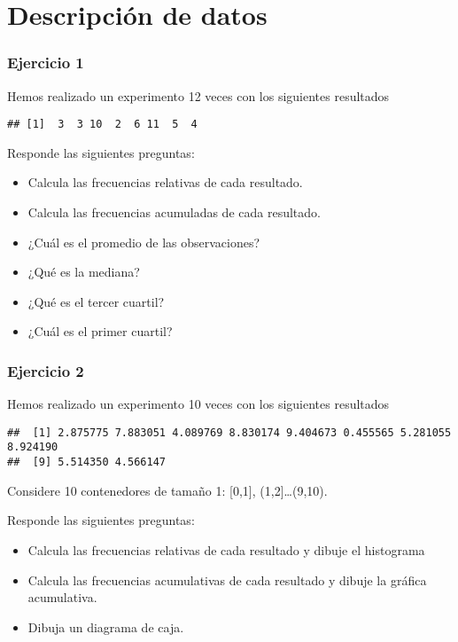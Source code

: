 \documentclass[
]{book}
\providecommand{\tightlist}{%
  \setlength{\itemsep}{0pt}\setlength{\parskip}{0pt}}
\begin{document}
\hypertarget{descripciuxf3n-de-datos-1}{%
\section{Descripción de datos}\label{descripciuxf3n-de-datos-1}}

\hypertarget{ejercicio-1}{%
\subsubsection{Ejercicio 1}\label{ejercicio-1}}

Hemos realizado un experimento 12 veces con los siguientes resultados

\begin{verbatim}
## [1]  3  3 10  2  6 11  5  4
\end{verbatim}

Responde las siguientes preguntas:

\begin{itemize}
\tightlist
\item
  Calcula las frecuencias relativas de cada resultado.
\item
  Calcula las frecuencias acumuladas de cada resultado.
\item
  ¿Cuál es el promedio de las observaciones?
\item
  ¿Qué es la mediana?
\item
  ¿Qué es el tercer cuartil?
\item
  ¿Cuál es el primer cuartil?
\end{itemize}

\hypertarget{ejercicio-2}{%
\subsubsection{Ejercicio 2}\label{ejercicio-2}}

Hemos realizado un experimento 10 veces con los siguientes resultados

\begin{verbatim}
##  [1] 2.875775 7.883051 4.089769 8.830174 9.404673 0.455565 5.281055 8.924190
##  [9] 5.514350 4.566147
\end{verbatim}

Considere 10 contenedores de tamaño 1: {[}0,1{]}, (1,2{]}\ldots(9,10).

Responde las siguientes preguntas:

\begin{itemize}
\item
  Calcula las frecuencias relativas de cada resultado y dibuje el histograma
\item
  Calcula las frecuencias acumulativas de cada resultado y dibuje la gráfica acumulativa.
\item
  Dibuja un diagrama de caja.
\end{itemize}
\end{document}
